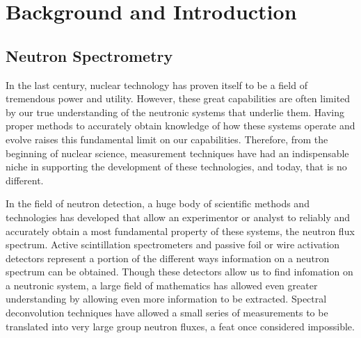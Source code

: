 
\cleardoublepage


\chapter{Background and Introduction}



\section{Neutron Spectrometry}
In the last century, nuclear technology has proven itself to be a field of tremendous power and utility.
However, these great capabilities are often limited by our true understanding of the neutronic systems that underlie them.
Having proper methods to accurately obtain knowledge of how these systems operate and evolve raises this fundamental limit on our capabilities.
Therefore, from the beginning of nuclear science, measurement techniques have had an indispensable niche in supporting the development of these technologies, and today, that is no different.


In the field of neutron detection, a huge body of scientific methods and technologies has developed that allow an experimentor or analyst to reliably and accurately obtain a most fundamental property of these systems, the neutron flux spectrum.
Active scintillation spectrometers and passive foil or wire activation detectors represent a portion of the different ways information on a neutron spectrum can be obtained.
Though these detectors allow us to find infomation on a neutronic system, a large field of mathematics has allowed even greater understanding by allowing even more information to be extracted.
Spectral deconvolution techniques have allowed a small series of measurements to be translated into very large group neutron fluxes, a feat once considered impossible.


